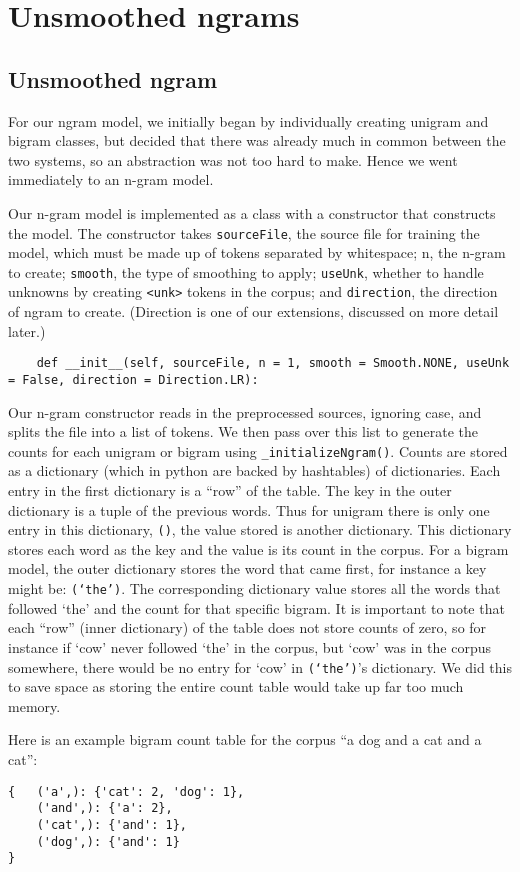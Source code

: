 \documentclass{article}
\begin{document}
\section{Unsmoothed ngrams}

\subsection{Unsmoothed ngram}

For our ngram model, we initially began by individually creating unigram and bigram classes, but decided that there was already much in common between the two systems, so an abstraction was not too hard to make. Hence we went immediately to an n-gram model. 

Our n-gram model is implemented as a class with a constructor that constructs the model. The constructor takes \texttt{sourceFile}, the source file for training the model, which must be made up of tokens separated by whitespace; n, the n-gram to create; \texttt{smooth}, the type of smoothing to apply; \texttt{useUnk}, whether to handle unknowns by creating \texttt{<unk>} tokens in the corpus; and \texttt{direction}, the direction of ngram to create. (Direction is one of our extensions, discussed on more detail later.)

{\small\begin{verbatim}
    def __init__(self, sourceFile, n = 1, smooth = Smooth.NONE, useUnk = False, direction = Direction.LR):
\end{verbatim}}

Our n-gram constructor reads in the preprocessed sources, ignoring case, and splits the file into a list of tokens. We then pass over this list to generate the counts for each unigram or bigram using \texttt{\_initializeNgram()}. Counts are stored as a dictionary (which in python are  backed by hashtables) of dictionaries. Each entry in the first dictionary is a ``row'' of the table. The key in the outer dictionary is a tuple of the previous words. Thus for unigram there is only one entry in this dictionary, \texttt{()}, the value stored is another dictionary. This dictionary stores each word as the key and the value is its count in the corpus. For a bigram model, the outer dictionary stores the word that came first, for instance a key might be: \texttt{(`the')}. The corresponding dictionary value stores all the words that followed `the' and the count for that specific bigram. It is important to note that each ``row'' (inner dictionary) of the table does not store counts of zero, so for instance if `cow' never followed `the' in the corpus, but `cow' was in the corpus somewhere, there would be no entry for `cow' in \texttt{(`the')}'s dictionary. We did this to save space as storing the entire count table would take up far too much memory.\par
Here is an example bigram count table for the corpus ``a dog and a cat and a cat'':
\begin{verbatim}
{   ('a',): {'cat': 2, 'dog': 1},
    ('and',): {'a': 2},
    ('cat',): {'and': 1},
    ('dog',): {'and': 1}
}
\end{verbatim}
\end{document}
